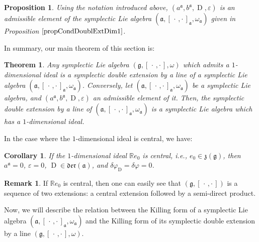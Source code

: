 \documentclass[final,1p,times,nopreprintline]{elsarticle}
\newtheorem{theorem}{Theorem}[section]
\newtheorem{proposition}{Proposition}[section]
\newtheorem{corollary}{Corollary}[section]
\theoremstyle{definition}
\newtheorem{remark}{Remark}[section]
\numberwithin{equation}{section}
\newcommand{\rel}{\mathbb{R}}
\newcommand{\w}{\omega}
\newcommand{\g}{\mathfrak{g}}
\newcommand{\ai}{\mathfrak{a}}
\numberwithin{equation}{section}
\newcommand{\D}{\operatorname{D}}
\newcommand{\cro}{[\,\cdot\,,\cdot\,]}
\begin{document}
\begin{proposition}
Using the notation introduced above, $(a^\ai,b^\ai,\D,\varepsilon)$ is an admissible element of the symplectic Lie algebra $(\ai,\cro_\ai,\w_\ai)$ given in Proposition $\ref{propCondDoublExtDim1}$.
\end{proposition}

In summary, our main theorem of this section is: 

\begin{theorem}\label{TheoDoubExtdim1}
	Any symplectic Lie algebra $(\g,\cro,\w)$ which admits a $1$-dimensional ideal is a symplectic double extension by a line of a symplectic Lie algebra $(\ai,\cro_\ai,\w_\ai)$. Conversely, let $(\ai,[\,\cdot\,,\cdot\,]_\ai,\w_\ai)$ be a symplectic Lie algebra, and $(a^\ai,b^\ai,\D,\varepsilon)$ an admissible element of it. Then, the symplectic double extension by a line of $(\ai,\cro_\ai,\w_\ai)$ is a symplectic Lie algebra which has a $1$-dimensional ideal.
\end{theorem}

In the case where the $1$-dimensional ideal is central, we have:

\begin{corollary}
	If the $1$-dimensional ideal $\rel e_0$ is central, i.e., $e_0\in\mathfrak{z}(\g)$, then $a^\ai=0$, $\varepsilon=0$, $\D\in\mathfrak{der}(\ai)$, and $\delta\varphi_{\D}=\delta\varphi=0$.
\end{corollary}

\begin{remark}
	If $\rel e_0$ is central, then one can easily see that $(\g,\cro)$ is a sequence of two extensions: a central extension followed by a semi-direct product.
\end{remark}

Now, we will describe the relation between the Killing form of a symplectic Lie algebra $(\ai,[\,\cdot\,,\cdot\,]_\ai,\w_\ai)$ and the Killing form of its symplectic double extension by a line $(\g,[\,\cdot\,,\cdot\,],\w)$.
\end{document}
